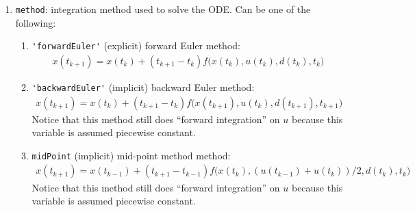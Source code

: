 \documentclass[11pt]{article}
\begin{document}
\begin{enumerate}
\item \lstinline{method}: integration method used to solve the
  ODE. Can be one of the following:
  \begin{enumerate}
  \item \lstinline{'forwardEuler'} (explicit) forward Euler method:
    \begin{align*}
      x(t_{k+1})= x(t_k)+ (t_{k+1}-t_k) f\big(x(t_k),u(t_k),d(t_k),t_k\big)
    \end{align*}
  \item \lstinline{'backwardEuler'} (implicit) backward Euler
    method:
    \begin{align*}
      x(t_{k+1})= x(t_k)+ (t_{k+1}-t_k) f\big(x(t_{k+1}),u(t_{k}),d(t_{k+1}),t_{k+1}\big)
    \end{align*}
    Notice that this method still does ``forward integration'' on $u$
    because this variable is assumed piecewise constant.
  \item \lstinline{midPoint} (implicit) mid-point method
    method:
    \begin{align*}
      x(t_{k+1})= x(t_{k-1})+ (t_{k+1}-t_{k-1}) f\big(x(t_k),(u(t_{k-1})+u(t_{k}))/2,d(t_k),t_k\big)
    \end{align*}
    Notice that this method still does ``forward integration'' on $u$
    because this variable is assumed piecewise constant.
  \end{enumerate}
\end{enumerate}


  

% 
% 
% 

\end{document}
